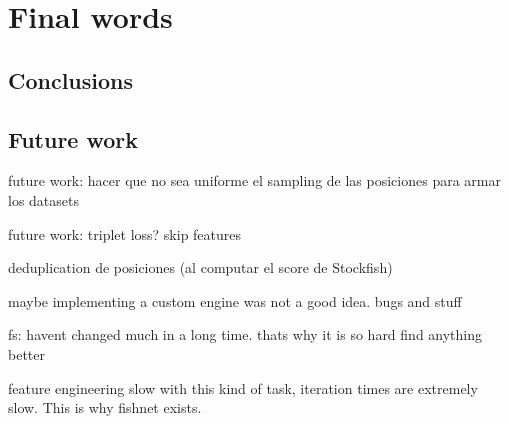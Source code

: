 \section{Final words}
\subsection{Conclusions}
\subsection{Future work}




future work: hacer que no sea uniforme el sampling de las posiciones para armar los datasets

future work: triplet loss? skip features

deduplication de posiciones (al computar el score de Stockfish)

maybe implementing a custom engine was not a good idea. bugs and stuff

fs: havent changed much in a long time. thats why it is so hard find anything better

feature engineering slow with this kind of task, iteration times are extremely slow. This is why fishnet exists.
